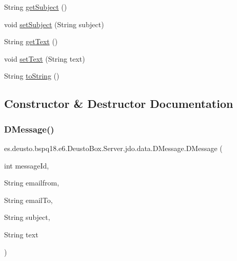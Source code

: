 \begin{DoxyCompactItemize}
\item 
String \mbox{\hyperlink{classes_1_1deusto_1_1bspq18_1_1e6_1_1_deusto_box_1_1_server_1_1jdo_1_1data_1_1_d_message_aa82a2ed6331fba3706777aceafeeaa4e}{get\+Subject}} ()
\item 
void \mbox{\hyperlink{classes_1_1deusto_1_1bspq18_1_1e6_1_1_deusto_box_1_1_server_1_1jdo_1_1data_1_1_d_message_a5f83f45dea236216cd4b31d4881d1f34}{set\+Subject}} (String subject)
\item 
String \mbox{\hyperlink{classes_1_1deusto_1_1bspq18_1_1e6_1_1_deusto_box_1_1_server_1_1jdo_1_1data_1_1_d_message_a722e691f386cb71f9d8e5df24c4ad4d5}{get\+Text}} ()
\item 
void \mbox{\hyperlink{classes_1_1deusto_1_1bspq18_1_1e6_1_1_deusto_box_1_1_server_1_1jdo_1_1data_1_1_d_message_af9244cfc24298f11f143ce31c54278ca}{set\+Text}} (String text)
\item 
String \mbox{\hyperlink{classes_1_1deusto_1_1bspq18_1_1e6_1_1_deusto_box_1_1_server_1_1jdo_1_1data_1_1_d_message_af8ce424b900a53d96f7ae30ec25edf19}{to\+String}} ()
\end{DoxyCompactItemize}


\subsection{Constructor \& Destructor Documentation}
\mbox{\label{classes_1_1deusto_1_1bspq18_1_1e6_1_1_deusto_box_1_1_server_1_1jdo_1_1data_1_1_d_message_a9475641f6dca03094b9bfac9109a4e33}} 
\subsubsection{\texorpdfstring{D\+Message()}{DMessage()}\hspace{0.1cm}{\footnotesize\ttfamily [1/2]}}
{\footnotesize\ttfamily es.\+deusto.\+bspq18.\+e6.\+Deusto\+Box.\+Server.\+jdo.\+data.\+D\+Message.\+D\+Message (\begin{DoxyParamCaption}\item[{int}]{message\+Id,  }\item[{String}]{emailfrom,  }\item[{String}]{email\+To,  }\item[{String}]{subject,  }\item[{String}]{text }\end{DoxyParamCaption})}

